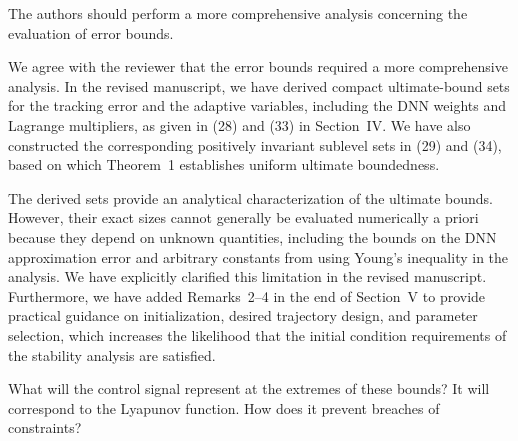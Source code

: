 \documentclass[12pt,english]{reviewresponse}
\providecommand{\DIFaddtex}[1]{{\protect\color{blue}\uwave{#1}}} %
\providecommand{\DIFaddbegin}{} %
\providecommand{\DIFaddend}{} %
\providecommand{\DIFadd}[1]{\texorpdfstring{\DIFaddtex{#1}}{#1}} %
\providecommand{\DIFaddincludegraphics}[2][]{{\color{blue}\fbox{\DIFOincludegraphics[#1]{#2}}}} %
\DeclareRobustCommand{\DIFaddbegin}{\DIFOaddbegin \let\includegraphics\DIFaddincludegraphics} %
\DeclareRobustCommand{\DIFaddend}{\DIFOaddend \let\includegraphics\DIFOincludegraphics} %
\begin{document}
% 
\begin{revcomment}[2][1]{}
	The authors should perform a more comprehensive analysis concerning the evaluation of error bounds.
\end{revcomment}

\begin{revresponse}
  We agree with the reviewer that the error bounds required a more comprehensive analysis.
  In the revised manuscript, we have derived compact ultimate-bound sets for the tracking error and the adaptive variables, including the DNN weights and Lagrange multipliers, as given in (28) and (33) in Section~IV.
  We have also constructed the corresponding positively invariant sublevel sets in (29) and (34), based on which Theorem~1 establishes uniform ultimate boundedness.

  \bigskip

  The derived sets provide an analytical characterization of the ultimate bounds. 
  However, their exact sizes cannot generally be evaluated numerically a priori because they depend on unknown quantities, including the bounds on the DNN approximation error and arbitrary constants from using Young's inequality in the analysis.
  We have explicitly clarified this limitation in the revised manuscript. 
  Furthermore, we have added Remarks~2--4 in the end of Section~\DIFaddbegin \DIFadd{I}\DIFaddend V to provide practical guidance on initialization, desired trajectory design, and parameter selection, which increases the likelihood that the initial condition requirements of the stability analysis are satisfied.

\end{revresponse}

% 
\begin{revcomment}[1][1]{}
	What will the control signal represent at the extremes of these bounds? It will correspond to the Lyapunov function. How does it prevent breaches of constraints?
\end{revcomment}
\end{document}
